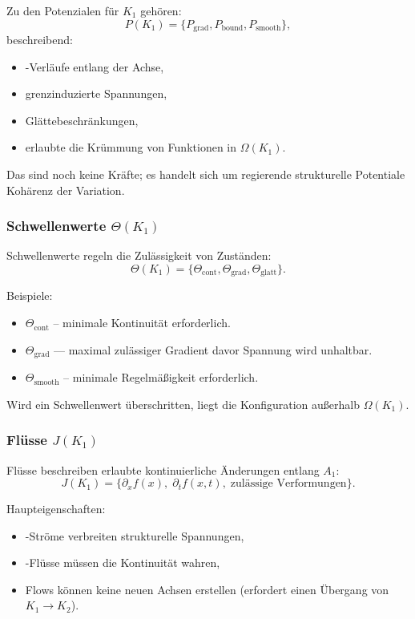 Zu den Potenzialen für $K_1$ gehören:
\[
P(K_1) = \{ P_{\mathrm{grad}}, P_{\mathrm{bound}}, P_{\mathrm{smooth}} \},
\]
beschreibend:
\begin{itemize}
    \item-Verläufe entlang der Achse,
    \item grenzinduzierte Spannungen,
    \item Glättebeschränkungen,
    \item erlaubte die Krümmung von Funktionen in $\Omega(K_1)$.
\end{itemize}

Das sind noch keine Kräfte; es handelt sich um regierende strukturelle Potentiale
Kohärenz der Variation.

\subsubsection{Schwellenwerte \texorpdfstring{$\Theta(K_1)$}{\Theta(K_1)}}

Schwellenwerte regeln die Zulässigkeit von Zuständen:
\[
\Theta(K_1) = \{ \Theta_{\mathrm{cont}}, \Theta_{\mathrm{grad}},
                 \Theta_{\mathrm{glatt}} \}.
\]

Beispiele:
\begin{itemize}
    \item $\Theta_{\mathrm{cont}}$ – minimale Kontinuität erforderlich.
    \item $\Theta_{\mathrm{grad}}$ — maximal zulässiger Gradient davor
          Spannung wird unhaltbar.
    \item $\Theta_{\mathrm{smooth}}$ – minimale Regelmäßigkeit erforderlich.
\end{itemize}

Wird ein Schwellenwert überschritten, liegt die Konfiguration außerhalb
$\Omega(K_1)$.

\subsubsection{Flüsse \texorpdfstring{$J(K_1)$}{J(K_1)}}

Flüsse beschreiben erlaubte kontinuierliche Änderungen entlang $A_1$:
\[
J(K_1) = \{ \partial_x f(x),\; \partial_t f(x,t),\; \text{zulässige Verformungen} \}.
\]

Haupteigenschaften:
\begin{itemize}
    \item-Ströme verbreiten strukturelle Spannungen,
    \item-Flüsse müssen die Kontinuität wahren,
    \item Flows können keine neuen Achsen erstellen (erfordert einen Übergang von $K_1\to K_2$).
\end{itemize}


